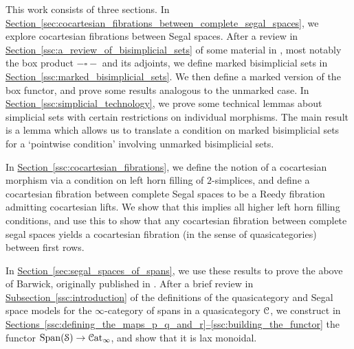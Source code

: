 \documentclass[main.tex]{subfiles}
\begin{document}
This work consists of three sections. In \hyperref[sec:cocartesian_fibrations_between_complete_segal_spaces]{Section~\ref*{sec:cocartesian_fibrations_between_complete_segal_spaces}}, we explore cocartesian fibrations between Segal spaces. After a review in \hyperref[ssc:a_review_of_bisimplicial_sets]{Section~\ref*{ssc:a_review_of_bisimplicial_sets}} of some material in \cite{qcats_vs_segal_spaces}, most notably the box product $- \square -$ and its adjoints, we define marked bisimplicial sets in \hyperref[ssc:marked_bisimplicial_sets]{Section~\ref*{ssc:marked_bisimplicial_sets}}. We then define a marked version of the box functor, and prove some results analogous to the unmarked case. In \hyperref[ssc:simplicial_technology]{Section~\ref*{ssc:simplicial_technology}}, we prove some technical lemmas about simplicial sets with certain restrictions on individual morphisms. The main result is a lemma which allows us to translate a condition on marked bisimplicial sets for a `pointwise condition' involving unmarked bisimplicial sets.

In \hyperref[ssc:cocartesian_fibrations]{Section~\ref*{ssc:cocartesian_fibrations}}, we define the notion of a cocartesian morphism via a condition on left horn filling of $2$-simplices, and define a cocartesian fibration between complete Segal spaces to be a Reedy fibration admitting cocartesian lifts. We show that this implies all higher left horn filling conditions, and use this to show that any cocartesian fibration between complete segal spaces yields a cocartesian fibration (in the sense of quasicategories) between first rows.

In \hyperref[sec:segal_spaces_of_spans]{Section~\ref*{sec:segal_spaces_of_spans}}, we use these results to prove the above of Barwick, originally published in \cite[Thm.~12.2]{spectralmackeyfunctors1}. After a brief review in \hyperref[ssc:introduction]{Subsection~\ref*{ssc:introduction}} of the definitions of the quasicategory and Segal space models for the $\infty$-category of spans in a quasicategory $\mathcal{C}$, we construct in \hyperref[ssc:defining_the_maps_p_q_and_r]{Sections~\ref*{ssc:defining_the_maps_p_q_and_r}--\ref*{ssc:building_the_functor}} the functor $\mathrm{Span}(\mathcal{S}) \to \mathcal{C}\mathrm{at}_{\infty}$, and show that it is lax monoidal.
\end{document}
